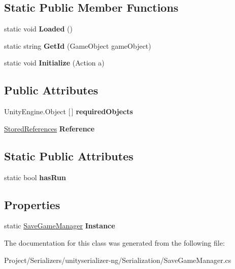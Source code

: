 \subsection*{Static Public Member Functions}
\begin{DoxyCompactItemize}
\item 
\mbox{\label{class_save_game_manager_a9500107785d79ae915b1b05ae2ab0109}} 
static void {\bfseries Loaded} ()
\item 
\mbox{\label{class_save_game_manager_a5cd4b817e3cb38c93423546f694bf4f5}} 
static string {\bfseries Get\+Id} (Game\+Object game\+Object)
\item 
\mbox{\label{class_save_game_manager_a235d2f2255aa65272e914ae2adf37e58}} 
static void {\bfseries Initialize} (Action a)
\end{DoxyCompactItemize}
\subsection*{Public Attributes}
\begin{DoxyCompactItemize}
\item 
\mbox{\label{class_save_game_manager_ac283b8025430fb42da7de00348802d10}} 
Unity\+Engine.\+Object \mbox{[}$\,$\mbox{]} {\bfseries required\+Objects}
\item 
\mbox{\label{class_save_game_manager_acc8730127bdf53e84b735585679ddb95}} 
\hyperlink{class_stored_references}{Stored\+References} {\bfseries Reference}
\end{DoxyCompactItemize}
\subsection*{Static Public Attributes}
\begin{DoxyCompactItemize}
\item 
\mbox{\label{class_save_game_manager_a3d69dbd52700e5a5291f9a1098469c49}} 
static bool {\bfseries has\+Run}
\end{DoxyCompactItemize}
\subsection*{Properties}
\begin{DoxyCompactItemize}
\item 
\mbox{\label{class_save_game_manager_a305a46aed22f9f5d1fd473f033b90408}} 
static \hyperlink{class_save_game_manager}{Save\+Game\+Manager} {\bfseries Instance}
\end{DoxyCompactItemize}


The documentation for this class was generated from the following file\+:\begin{DoxyCompactItemize}
\item 
Project/\+Serializers/unityserializer-\/ng/\+Serialization/Save\+Game\+Manager.\+cs\end{DoxyCompactItemize}

